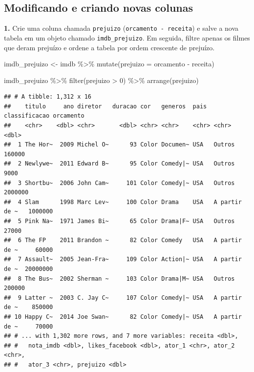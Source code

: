\documentclass[
]{book}
\newenvironment{Shaded}{\begin{snugshade}}{\end{snugshade}}
\newcommand{\AttributeTok}[1]{\textcolor[rgb]{0.77,0.63,0.00}{#1}}
\newcommand{\DecValTok}[1]{\textcolor[rgb]{0.00,0.00,0.81}{#1}}
\newcommand{\FunctionTok}[1]{\textcolor[rgb]{0.00,0.00,0.00}{#1}}
\newcommand{\NormalTok}[1]{#1}
\newcommand{\OtherTok}[1]{\textcolor[rgb]{0.56,0.35,0.01}{#1}}
\newcommand{\SpecialCharTok}[1]{\textcolor[rgb]{0.00,0.00,0.00}{#1}}
\begin{document}
\hypertarget{modificando-e-criando-novas-colunas-1}{%
\subsection*{Modificando e criando novas colunas}\label{modificando-e-criando-novas-colunas-1}}

\textbf{1.} Crie uma coluna chamada \texttt{prejuizo} (\texttt{orcamento\ -\ receita}) e salve a nova tabela em um objeto chamado \texttt{imdb\_prejuizo}. Em seguida, filtre apenas os filmes que deram prejuízo e ordene a tabela por ordem crescente de prejuízo.

\begin{Shaded}
\begin{Highlighting}[]
\NormalTok{imdb\_prejuizo }\OtherTok{\textless{}{-}}\NormalTok{ imdb }\SpecialCharTok{\%\textgreater{}\%} 
  \FunctionTok{mutate}\NormalTok{(}\AttributeTok{prejuizo =}\NormalTok{ orcamento }\SpecialCharTok{{-}}\NormalTok{ receita)}

\NormalTok{imdb\_prejuizo }\SpecialCharTok{\%\textgreater{}\%} 
  \FunctionTok{filter}\NormalTok{(prejuizo }\SpecialCharTok{\textgreater{}} \DecValTok{0}\NormalTok{) }\SpecialCharTok{\%\textgreater{}\%} 
  \FunctionTok{arrange}\NormalTok{(prejuizo)}
\end{Highlighting}
\end{Shaded}

\begin{verbatim}
## # A tibble: 1,312 x 16
##    titulo     ano diretor   duracao cor   generos  pais  classificacao orcamento
##    <chr>    <dbl> <chr>       <dbl> <chr> <chr>    <chr> <chr>             <dbl>
##  1 The Hor~  2009 Michel O~      93 Color Documen~ USA   Outros           160000
##  2 Newlywe~  2011 Edward B~      95 Color Comedy|~ USA   Outros             9000
##  3 Shortbu~  2006 John Cam~     101 Color Comedy|~ USA   Outros          2000000
##  4 Slam      1998 Marc Lev~     100 Color Drama    USA   A partir de ~   1000000
##  5 Pink Na~  1971 James Bi~      65 Color Drama|F~ USA   Outros            27000
##  6 The FP    2011 Brandon ~      82 Color Comedy   USA   A partir de ~     60000
##  7 Assault~  2005 Jean-Fra~     109 Color Action|~ USA   A partir de ~  20000000
##  8 The Bus~  2002 Sherman ~     103 Color Drama|M~ USA   Outros           200000
##  9 Latter ~  2003 C. Jay C~     107 Color Comedy|~ USA   A partir de ~    850000
## 10 Happy C~  2014 Joe Swan~      82 Color Comedy|~ USA   A partir de ~     70000
## # ... with 1,302 more rows, and 7 more variables: receita <dbl>,
## #   nota_imdb <dbl>, likes_facebook <dbl>, ator_1 <chr>, ator_2 <chr>,
## #   ator_3 <chr>, prejuizo <dbl>
\end{verbatim}
\end{document}
